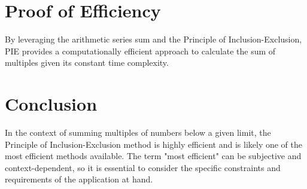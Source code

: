 \documentclass{article}
\begin{document}
\section*{Proof of Efficiency}
By leveraging the arithmetic series sum and the Principle of Inclusion-Exclusion, PIE provides a computationally efficient approach to calculate the sum of multiples given its constant time complexity.

\section*{Conclusion}
In the context of summing multiples of numbers below a given limit, the Principle of Inclusion-Exclusion method is highly efficient and is likely one of the most efficient methods available. The term "most efficient" can be subjective and context-dependent, so it is essential to consider the specific constraints and requirements of the application at hand.
\end{document}
